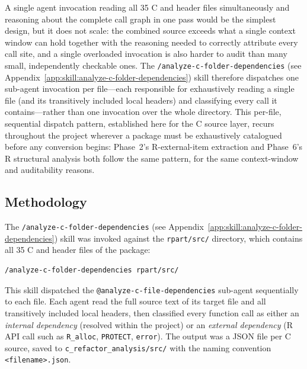 \documentclass[12pt]{article}
\newcommand{\skillapp}[2]{\texttt{/#1} (see Appendix~\ref{app:skill:#2})}
\begin{document}
A single agent invocation reading all 35 C and header files simultaneously and reasoning about the complete call graph in one pass would be the simplest design, but it does not scale: the combined source exceeds what a single context window can hold together with the reasoning needed to correctly attribute every call site, and a single overloaded invocation is also harder to audit than many small, independently checkable ones. The \skillapp{analyze-c-folder-dependencies}{analyze-c-folder-dependencies} skill therefore dispatches one sub-agent invocation per file---each responsible for exhaustively reading a single file (and its transitively included local headers) and classifying every call it contains---rather than one invocation over the whole directory. This per-file, sequential dispatch pattern, established here for the C source layer, recurs throughout the project wherever a package must be exhaustively catalogued before any conversion begins: Phase~2's R-external-item extraction and Phase~6's R structural analysis both follow the same pattern, for the same context-window and auditability reasons.

\subsection{Methodology}

The \skillapp{analyze-c-folder-dependencies}{analyze-c-folder-dependencies} skill was invoked against the \texttt{rpart/src/} directory, which contains all 35 C and header files of the package:
\begin{lstlisting}[style=skill]
/analyze-c-folder-dependencies rpart/src/
\end{lstlisting}

This skill dispatched the \texttt{@analyze-c-file-dependencies} sub-agent sequentially to each file. Each agent read the full source text of its target file and all transitively included local headers, then classified every function call as either an \emph{internal dependency} (resolved within the project) or an \emph{external dependency} (R API call such as \texttt{R\_alloc}, \texttt{PROTECT}, \texttt{error}). The output was a JSON file per C source, saved to \texttt{c\_refactor\_analysis/src/} with the naming convention \texttt{<filename>.json}.
\end{document}
